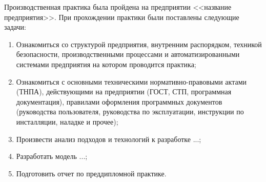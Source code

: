 \label{sec:practice:introduction}
Производственная практика была пройдена на предприятии <<название предприятия>>. При прохождении практики были поставлены следующие задачи:
\begin{enumerate}[label=\arabic*.]
    \item {Ознакомиться со структурой предприятия, внутренним распорядком, техникой безопасности, производственными процессами и автоматизированными системами предприятия на котором проводится практика;}
    \item{Ознакомиться с основными техническими нормативно-правовыми актами (ТНПА), действующими на предприятии (ГОСТ, СТП, программная документация), правилами  оформления программных документов (руководства пользователя, руководства по эксплуатации, инструкции по инсталляции, наладке и прочее);}
    \item{Произвести анализ подходов и технологий к разработке ...;} %
    \item{Разработать модель ...;} %
    \item{Подготовить отчет по преддипломной практике.}
\end{enumerate}